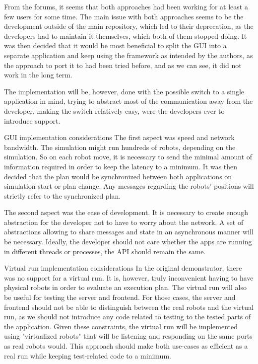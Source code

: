 From the forums, it seems that both approaches had been working for at least a few users for some time. The main issue with both approaches seems to be the development outside of the main repository, which led to their deprecation, as the developers had to maintain it themselves, which both of them stopped doing.
It was then decided that it would be most beneficial to split the GUI into a separate application and keep using the framework as intended by the authors, as the approach to port it to {\cmake} had been tried before, and as we can see, it did not work in the long term.

The implementation will be, however, done with the possible switch to a single application in mind, trying to abstract most of the communication away from the developer, making the switch relatively easy, were the developers ever to introduce {\cmake} support.

\sec GUI implementation considerations
The first aspect was speed and network bandwidth. The simulation might run hundreds of robots, depending on the simulation. So on each robot move, it is necessary to send the minimal amount of information required in order to keep the latency to a minimum. 
It was then decided that the plan would be synchronized between both applications on simulation start or plan change. Any messages regarding the robots' positions will strictly refer to the synchronized plan.

The second aspect was the ease of development. It is necessary to create enough abstraction for the developer not to have to worry about the network. A set of abstractions allowing to share messages and state in an asynchronous manner will be necessary. Ideally, the developer should not care whether the apps are running in different threads or processes, the API should remain the same.

\sec Virtual run implementation considerations
In the original demonstrator, there was no support for a virtual run. It is, however, truly inconvenient having to have physical robots in order to evaluate an execution plan. The virtual run will also be useful for testing the server and frontend. For those cases, the server and frontend should not be able to distinguish between the real robots and the virtual run, as we should not introduce any code related to testing to the tested parts of the application. Given these constraints, the virtual run will be implemented using "virtualized robots" that will be listening and responding on the same ports as real robots would. This approach should make both use-cases as efficient as a real run while keeping test-related code to a minimum.

